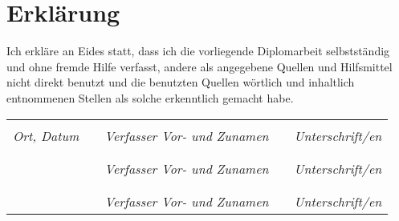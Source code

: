 

\chapter*{Erklärung}



Ich erkläre an Eides statt, dass ich die vorliegende Diplomarbeit selbstständig und ohne fremde Hilfe verfasst, andere als angegebene Quellen und Hilfsmittel nicht direkt benutzt und die benutzten Quellen wörtlich und inhaltlich entnommenen Stellen als solche erkenntlich gemacht habe.
\vspace{3cm}

\begin{tabularx}{1\textwidth}{X p{1cm} X p{1cm} X}


\hrulefill & & \hrulefill & & \hrulefill \\
\emph{Ort, Datum} & & \emph{Verfasser Vor- und Zunamen} & & \emph{Unterschrift/en} \\ \\
 & & \hrulefill & & \hrulefill \\
 & & \emph{Verfasser Vor- und Zunamen} & & \emph{Unterschrift/en} \\ \\ 
 & & \hrulefill & & \hrulefill \\
 & & \emph{Verfasser Vor- und Zunamen} & & \emph{Unterschrift/en}
\end{tabularx}


